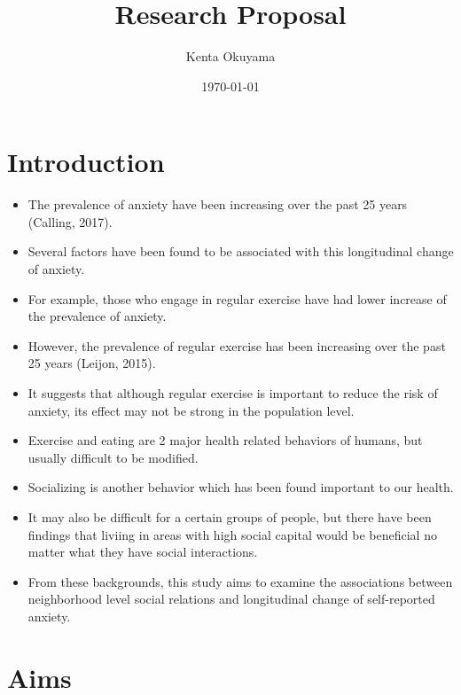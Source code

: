 \documentclass{article}
\title{Research Proposal}
\date{\today}
\author{Kenta Okuyama}
\begin{document}
\maketitle

\section{Introduction} 
\begin{itemize}
	\item The prevalence of anxiety have been increasing over the past 25 years (Calling, 2017).
	\item Several factors have been found to be associated with this longitudinal change of anxiety.
	\item For example, those who engage in regular exercise have had lower increase of the prevalence of anxiety.
	\item However, the prevalence of regular exercise has been increasing over the past 25 years (Leijon, 2015).
	\item It suggests that although regular exercise is important to reduce the risk of anxiety, its effect may not be strong in the population level.
	\item Exercise and eating are 2 major health related behaviors of humans, but usually difficult to be modified.
	\item Socializing is another behavior which has been found important to our health.
	\item It may also be difficult for a certain groups of people, but there have been findings that liviing in areas with high social capital would be beneficial no matter what they have social interactions.
	\item From these backgrounds, this study aims to examine the associations between neighborhood level social relations and longitudinal change of self-reported anxiety.
\end{itemize}

\section{Aims}
\end{document}
